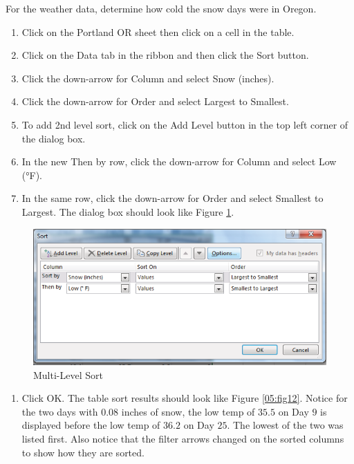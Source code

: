 For the weather data, determine how cold the snow days were in Oregon.

\begin{enumerate}
	\item Click on the Portland OR sheet then click on a cell in the table.
	\item Click on the Data tab in the ribbon and then click the Sort button.
	\item Click the down-arrow for Column and select Snow (inches).
	\item Click the down-arrow for Order and select Largest to Smallest.
	\item To add 2nd level sort, click on the Add Level button in the top left corner of the dialog box.
	\item In the new Then by row, click the down-arrow for Column and select Low (°F).
	\item In the same row, click the down-arrow for Order and select Smallest to Largest. The dialog box should look like Figure \ref{05:fig11}.
\end{enumerate}

\begin{figure}[H]
	\centering
	\includegraphics[width=\maxwidth{.95\linewidth}]{gfx/ch05_fig11}
	\caption{Multi-Level Sort}
	\label{05:fig11}
\end{figure}

\begin{enumerate}[resume]
	\item Click OK. The table sort results should look like Figure \ref{05:fig12}. Notice for the two days with $ 0.08 $ inches of snow, the low temp of $ 35.5 $ on Day $ 9 $ is displayed before the low temp of $ 36.2 $ on Day $ 25 $. The lowest of the two was listed first. Also notice that the filter arrows changed on the sorted columns to show how they are sorted.
\end{enumerate}

